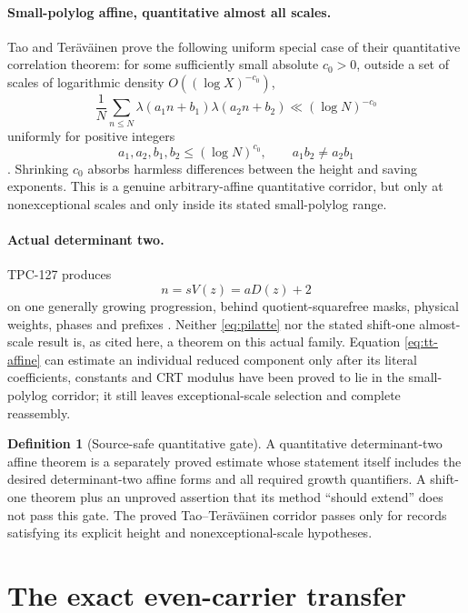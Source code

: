 \documentclass[11pt]{article}
\theoremstyle{definition}
\newtheorem{definition}[theorem]{Definition}
\theoremstyle{remark}
\begin{document}
\paragraph{Small-polylog affine, quantitative almost all scales.}
Tao and Ter\"av\"ainen prove the following uniform special case of
their quantitative correlation theorem: for some sufficiently
small absolute \(c_0>0\), outside a set of scales of logarithmic
density \(O((\log X)^{-c_0})\),
\begin{equation}
 \frac1N\sum_{n\le N}
 \lambda(a_1n+b_1)\lambda(a_2n+b_2)
 \ll(\log N)^{-c_0}
\label{eq:tt-affine}
\end{equation}
uniformly for positive integers
\[
 a_1,a_2,b_1,b_2\le(\log N)^{c_0},
 \qquad a_1b_2\ne a_2b_1
\]
\citep[Theorem~3.1 and Remarks~3.2]{TaoTeravainen2026}.
Shrinking \(c_0\) absorbs harmless differences between the height
and saving exponents.  This is a genuine arbitrary-affine
quantitative corridor, but only at nonexceptional scales and only
inside its stated small-polylog range.

\paragraph{Actual determinant two.}
TPC-127 produces
\[
 n=sV(z)=aD(z)+2
\]
on one generally growing progression, behind quotient-squarefree
masks, physical weights, phases and prefixes
\citep{WangTPC127}.  Neither \eqref{eq:pilatte} nor the stated
shift-one almost-scale result is, as cited here, a theorem on this
actual family.  Equation \eqref{eq:tt-affine} can estimate an
individual reduced component only after its literal coefficients,
constants and CRT modulus have been proved to lie in the
small-polylog corridor; it still leaves exceptional-scale
selection and complete reassembly.

\begin{definition}[Source-safe quantitative gate]
\label{def:gate}
A quantitative determinant-two affine theorem is a separately
proved estimate whose statement itself includes the desired
determinant-two affine forms and all required growth quantifiers.
A shift-one theorem plus an unproved assertion that its method
``should extend'' does not pass this gate.  The proved
Tao--Ter\"av\"ainen corridor passes only for records satisfying its
explicit height and nonexceptional-scale hypotheses.
\end{definition}

\section{The exact even-carrier transfer}
\end{document}
